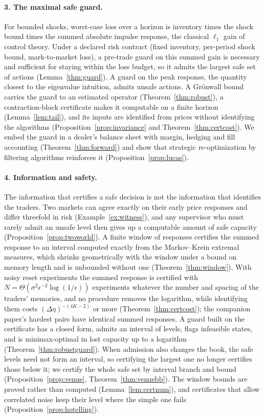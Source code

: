 \documentclass[12pt]{article}
\theoremstyle{definition}
\theoremstyle{remark}
\begin{document}
\paragraph{3. The maximal safe guard.} For bounded shocks, worst-case loss over a horizon is inventory times the shock bound times the summed absolute impulse response, the classical $\ell_1$ gain of control theory. Under a declared risk contract (fixed inventory, per-period shock bound, mark-to-market loss), a pre-trade guard on this summed gain is necessary and sufficient for staying within the loss budget, so it admits the largest safe set of actions (Lemma~\ref{thm:guard}). A guard on the peak response, the quantity closest to the eigenvalue intuition, admits unsafe actions. A Gr\"onwall bound carries the guard to an estimated operator (Theorem~\ref{thm:robust}), a contraction-block certificate makes it computable on a finite horizon (Lemma~\ref{lem:tail}), and its inputs are identified from prices without identifying the algorithms (Proposition~\ref{prop:invariance} and Theorem~\ref{thm:certcost}). We embed the guard in a dealer's balance sheet with margin, hedging and fill accounting (Theorem~\ref{thm:forward}) and show that strategic re-optimization by filtering algorithms reinforces it (Proposition~\ref{prop:lucas}).

\paragraph{4. Information and safety.} The information that certifies a safe decision is not the information that identifies the traders. Two markets can agree exactly on their early price responses and differ threefold in risk (Example~\ref{ex:witness}), and any supervisor who must rarely admit an unsafe level then gives up a computable amount of safe capacity (Proposition~\ref{prop:twoworld}). A finite window of responses certifies the summed response to an interval computed exactly from the Markov--Krein extremal measures, which shrinks geometrically with the window under a bound on memory length and is unbounded without one (Theorem~\ref{thm:window}). With noisy reset experiments the summed response is certified with $N=\Theta(\sigma^2\epsilon^{-2}\log(1/\epsilon))$ experiments whatever the number and spacing of the traders' memories, and no procedure removes the logarithm, while identifying them costs $(\Delta\eta)^{-(4K-2)}$ or more (Theorem~\ref{thm:certcost}); the companion paper's hardest pairs have identical summed responses. A guard built on the certificate has a closed form, admits an interval of levels, flags infeasible states, and is minimax-optimal in lost capacity up to a logarithm (Theorem~\ref{thm:robustguard}). When admission also changes the book, the safe levels need not form an interval, so certifying the largest one no longer certifies those below it; we certify the whole safe set by interval branch and bound (Proposition~\ref{prop:venue}, Theorem~\ref{thm:venuebb}). The window bounds are proved rather than computed (Lemma~\ref{lem:certnum}), and certificates that allow correlated noise keep their level where the simple one fails (Proposition~\ref{prop:hotelling}).
\end{document}

